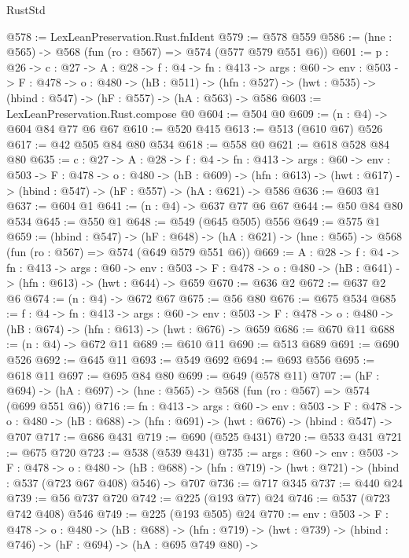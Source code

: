 \begin{lexlean}{RustStd}
\begin{coremodule}
{\begin{coremodule}
{@578 := LexLeanPreservation.Rust.fnIdent
@579 := @578 @559
@586 := (hne : @565) -> @568 (fun (ro : @567) => @574 (@577 @579 @551 @6))
@601 := {p : @26} ->
  {c : @27} ->
  {A : @28} ->
  {f : @4} ->
  {fn : @413} ->
  {args : @60} ->
  {env : @503} ->
  {F : @478} ->
  {o : @480} ->
  (hB : @511) ->
  (hfn : @527) -> (hwt : @535) -> (hbind : @547) -> (hF : @557) -> (hA : @563) -> @586
@603 := LexLeanPreservation.Rust.compose @0
@604 := @504 @0
@609 := (n : @4) -> @604 @84 @77 @6 @67
@610 := @520 @415
@613 := @513 (@610 @67) @526
@617 := @42 @505 @84 @80 @534
@618 := @558 @0
@621 := @618 @528 @84 @80
@635 := {c : @27} ->
  {A : @28} ->
  {f : @4} ->
  {fn : @413} ->
  {args : @60} ->
  {env : @503} ->
  {F : @478} ->
  {o : @480} ->
  (hB : @609) ->
  (hfn : @613) -> (hwt : @617) -> (hbind : @547) -> (hF : @557) -> (hA : @621) -> @586
@636 := @603 @1
@637 := @604 @1
@641 := (n : @4) -> @637 @77 @6 @67
@644 := @50 @84 @80 @534
@645 := @550 @1
@648 := @549 (@645 @505) @556
@649 := @575 @1
@659 := (hbind : @547) ->
  (hF : @648) -> (hA : @621) -> (hne : @565) -> @568 (fun (ro : @567) => @574 (@649 @579 @551 @6))
@669 := {A : @28} ->
  {f : @4} ->
  {fn : @413} ->
  {args : @60} ->
  {env : @503} -> {F : @478} -> {o : @480} -> (hB : @641) -> (hfn : @613) -> (hwt : @644) -> @659
@670 := @636 @2
@672 := @637 @2 @6
@674 := (n : @4) -> @672 @67
@675 := @56 @80
@676 := @675 @534
@685 := {f : @4} ->
  {fn : @413} ->
  {args : @60} ->
  {env : @503} -> {F : @478} -> {o : @480} -> (hB : @674) -> (hfn : @613) -> (hwt : @676) -> @659
@686 := @670 @11
@688 := (n : @4) -> @672 @11
@689 := @610 @11
@690 := @513 @689
@691 := @690 @526
@692 := @645 @11
@693 := @549 @692
@694 := @693 @556
@695 := @618 @11
@697 := @695 @84 @80
@699 := @649 (@578 @11)
@707 := (hF : @694) -> (hA : @697) -> (hne : @565) -> @568 (fun (ro : @567) => @574 (@699 @551 @6))
@716 := {fn : @413} ->
  {args : @60} ->
  {env : @503} ->
  {F : @478} -> {o : @480} -> (hB : @688) -> (hfn : @691) -> (hwt : @676) -> (hbind : @547) -> @707
@717 := @686 @431
@719 := @690 (@525 @431)
@720 := @533 @431
@721 := @675 @720
@723 := @538 (@539 @431)
@735 := {args : @60} ->
  {env : @503} ->
  {F : @478} ->
  {o : @480} ->
  (hB : @688) -> (hfn : @719) -> (hwt : @721) -> (hbind : @537 (@723 @67 @408) @546) -> @707
@736 := @717 @345
@737 := @440 @24
@739 := @56 @737 @720
@742 := @225 (@193 @77) @24
@746 := @537 (@723 @742 @408) @546
@749 := @225 (@193 @505) @24
@770 := {env : @503} ->
  {F : @478} ->
  {o : @480} ->
  (hB : @688) ->
  (hfn : @719) ->
  (hwt : @739) ->
  (hbind : @746) ->
  (hF : @694) ->
  (hA : @695 @749 @80) ->
}
\end{coremodule}}
\end{coremodule}
\end{lexlean}
